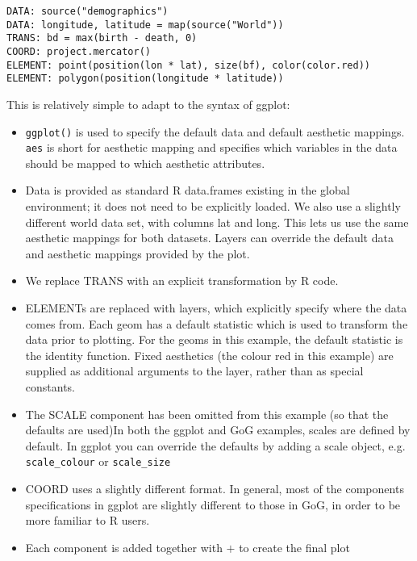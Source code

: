 \begin{verbatim}
DATA: source("demographics")
DATA: longitude, latitude = map(source("World"))
TRANS: bd = max(birth - death, 0)
COORD: project.mercator()
ELEMENT: point(position(lon * lat), size(bf), color(color.red))
ELEMENT: polygon(position(longitude * latitude))
\end{verbatim}

This is relatively simple to adapt to the syntax of ggplot:

\begin{itemize}
	
	\item {\tt ggplot()} is used to specify the default data and default aesthetic mappings.  {\tt aes} is short for aesthetic mapping and specifies which variables in the data should be mapped to which aesthetic attributes.
	
	\item Data is provided as standard R data.frames existing in the global environment; it does not need to be explicitly loaded.  We also use a slightly different world data set, with columns lat and long.  This lets us use the same aesthetic mappings for both datasets. Layers can override the default data and aesthetic mappings provided by the plot. 
	
	\item We replace {\sf TRANS} with an explicit transformation by R code.

	\item {\sf ELEMENT}s are replaced with layers, which explicitly specify where the data comes from.  Each geom has a default statistic which is used to transform the data prior to plotting.  For the geoms in this example, the default statistic is the identity function.  Fixed aesthetics (the colour red in this example) are supplied as additional arguments to the layer, rather than as special constants.

	\item The {\sf SCALE} component has been omitted from this example (so that the defaults are used)In both the ggplot and GoG examples, scales are defined by default.  In ggplot you can override the defaults by adding a scale object, e.g. {\tt scale\_colour} or {\tt scale\_size}

	\item {\sf COORD} uses a slightly different format.  In general, most of the components specifications in ggplot are slightly different to those in GoG, in order to be more familiar to R users.

	\item Each component is added together with $+$ to create the final plot

\end{itemize}

